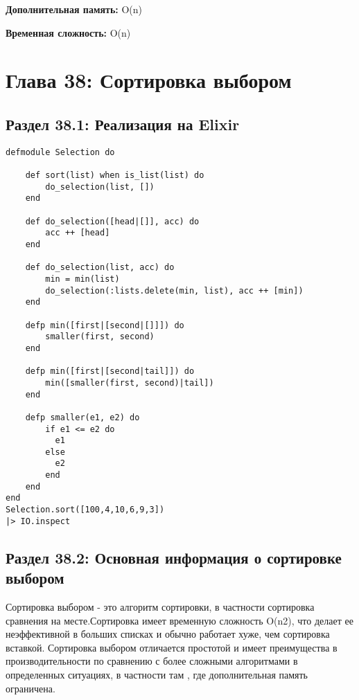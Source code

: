 \vspace{\baselineskip}
\textbf{Дополнительная память:} O(n) 

\textbf{Временная сложность:} O(n) 

\chapter*{Глава 38: Сортировка выбором}
\section*{Раздел 38.1: Реализация на Elixir}

\vspace{\baselineskip}
\begin{tcolorbox}
\begin{verbatim} 
defmodule Selection do

    def sort(list) when is_list(list) do
        do_selection(list, [])
    end
    
    def do_selection([head|[]], acc) do
        acc ++ [head]
    end
    
    def do_selection(list, acc) do
        min = min(list)
        do_selection(:lists.delete(min, list), acc ++ [min])
    end
    
    defp min([first|[second|[]]]) do
        smaller(first, second)
    end
    
    defp min([first|[second|tail]]) do
        min([smaller(first, second)|tail])
    end
    
    defp smaller(e1, e2) do
        if e1 <= e2 do
          e1
        else
          e2
        end
    end
end
Selection.sort([100,4,10,6,9,3])
|> IO.inspect

\end{verbatim}
\end{tcolorbox}

\section*{Раздел 38.2: Основная информация о сортировке выбором}

\vspace{\baselineskip}
Сортировка выбором - это алгоритм сортировки, в частности сортировка сравнения на месте.Сортировка имеет временную сложность O(n2), что делает ее неэффективной в больших списках и обычно работает хуже, чем сортировка вставкой. Сортировка выбором отличается простотой и имеет преимущества в производительности по сравнению с более сложными алгоритмами в определенных ситуациях, в частности там , где дополнительная память ограничена.

